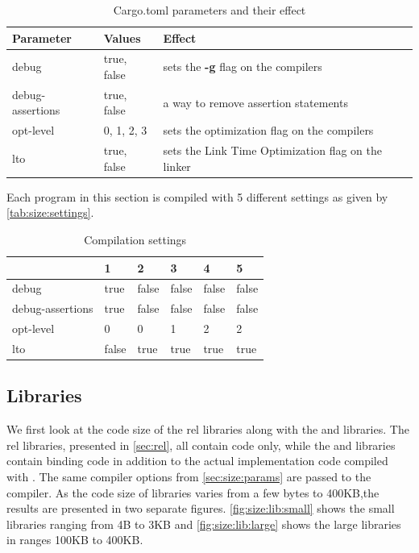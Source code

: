 \begin{table}[H]
  \centering
  \begin{tabular}{l|l|l}

    \textbf{Parameter} & \textbf{Values} & \textbf{Effect} \\
    \hline
    debug & true, false & sets the \textbf{-g} flag on the compilers  \\
    debug-assertions & true, false & a way to remove assertion statements \\
    opt-level & 0, 1, 2, 3 & sets the optimization flag on the compilers \\
    lto & true, false & sets the Link Time Optimization flag on the linker \\
    \hline
  \end{tabular}
  \caption{Cargo.toml parameters and their effect}
  \label{tab:size:params}
\end{table}

Each program in this section is compiled with 5 different settings as given by \autoref{tab:size:settings}.
\begin{table}[H]
  \centering
  \begin{tabular}{l|l|l|l|l|l}
    & \textbf{1} & \textbf{2} & \textbf{3} & \textbf{4} & \textbf{5} \\
    \hline
    debug            & true  & false & false & false & false \\
    debug-assertions & true  & false & false & false & false \\
    opt-level        & 0     & 0     & 1     & 2     & 2     \\
    lto              & false & true  & true  & true  & true  \\
    \hline
  \end{tabular}
  \caption{Compilation settings}
  \label{tab:size:settings}
\end{table}

\subsection{Libraries}

We first look at the code size of the \gls{rel} libraries along with the  and  libraries.
The \gls{rel} libraries, presented in \autoref{sec:rel}, all contain {\rust} code only, while the  and  libraries contain {\rust} binding code in addition to the actual {\C} implementation code compiled with .
The same compiler options from \autoref{sec:size:params} are passed to the {\C} compiler.
As the code size of libraries varies from a few bytes to 400KB,the results are presented in two separate figures.
\autoref{fig:size:lib:small} shows the small libraries ranging from 4B to 3KB and \autoref{fig:size:lib:large} shows the large libraries in ranges 100KB to 400KB.

